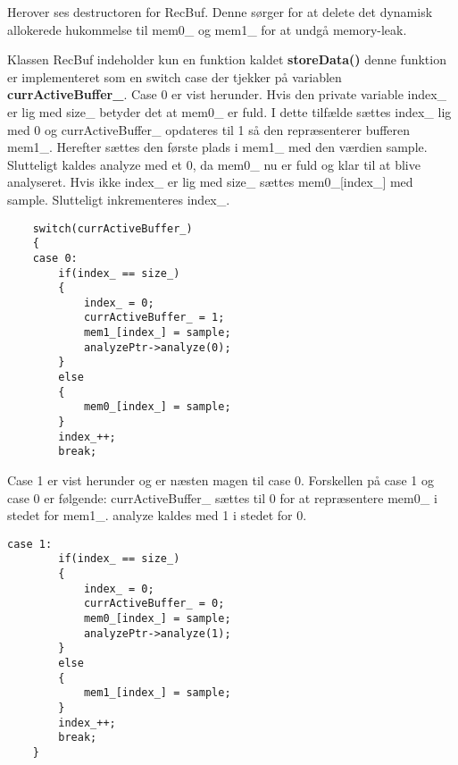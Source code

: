 Herover ses destructoren for RecBuf. Denne sørger for at delete det dynamisk allokerede hukommelse til mem0\_ og mem1\_ for at undgå memory-leak. 

Klassen RecBuf indeholder kun en funktion kaldet \textbf{storeData()} denne funktion er implementeret som en switch case der tjekker på variablen \textbf{currActiveBuffer\_}. Case 0 er vist herunder. 
Hvis den private variable index\_ er lig med size\_ betyder det at mem0\_ er fuld. I dette tilfælde sættes index\_ lig med 0 og currActiveBuffer\_ opdateres til 1 så den repræsenterer bufferen mem1\_. Herefter sættes den første plads i mem1\_ med den værdien sample. Slutteligt kaldes analyze med et 0, da mem0\_ nu er fuld og klar til at blive analyseret. Hvis ikke index\_ er lig med size\_ sættes mem0\_[index\_] med sample. Slutteligt inkrementeres index\_. 

\begin{verbatim}
	switch(currActiveBuffer_)
	{
	case 0:
		if(index_ == size_)
		{
			index_ = 0;
			currActiveBuffer_ = 1;
			mem1_[index_] = sample;
			analyzePtr->analyze(0);
		}
		else
		{
			mem0_[index_] = sample;
		}
		index_++;
		break;
\end{verbatim}

Case 1 er vist herunder og er næsten magen til case 0. Forskellen på case 1 og case 0 er følgende: 
currActiveBuffer\_ sættes til 0 for at repræsentere mem0\_ i stedet for mem1\_. 
analyze kaldes med 1 i stedet for 0. 

\begin{verbatim}
case 1:
		if(index_ == size_)
		{
			index_ = 0;
			currActiveBuffer_ = 0;
			mem0_[index_] = sample;
			analyzePtr->analyze(1);
		}
		else
		{
			mem1_[index_] = sample;
		}
		index_++;
		break;
	}
\end{verbatim}



